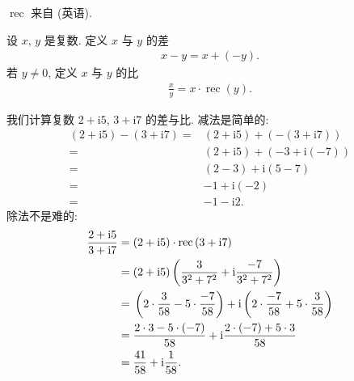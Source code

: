\documentclass[../libro.tex]{subfiles}
\begin{document}
\(\operatorname{rec}\) 来自  (英语).

\begin{definition}
    设 \(x\), \(y\) 是复数.
    定义 \(x\) 与 \(y\) 的差
    \begin{align*}
        x - y = x + (-y).
    \end{align*}
    若 \(y \neq 0\), 定义 \(x\) 与 \(y\) 的比
    \begin{align*}
        \frac{x}{y} = x \cdot \operatorname{rec} {(y)}.
    \end{align*}
\end{definition}

\begin{example}
    我们计算复数
    \(2 + \mathrm{i} 5\), \(3 + \mathrm{i} 7\)
    的差与比.
    减法是简单的:
    \begin{align*}
        (2 + \mathrm{i} 5) - (3 + \mathrm{i} 7)
        = {} &
        (2 + \mathrm{i} 5) + (-(3 + \mathrm{i} 7))
        \\
        = {} &
        (2 + \mathrm{i} 5) + (-3 + \mathrm{i} (-7))
        \\
        = {} &
        (2 - 3) + \mathrm{i} (5 - 7)
        \\
        = {} &
        {-1} + \mathrm{i} (-2)
        \\
        = {} &
        {-1} - \mathrm{i} 2.
    \end{align*}
    除法不是难的:
    \begin{align*}
        \frac{2 + \mathrm{i} 5}{3 + \mathrm{i} 7}
        = {} &
        (2 + \mathrm{i} 5)
        \cdot
        \operatorname{rec} {(3 + \mathrm{i} 7)}
        \\
        = {} &
        (2 + \mathrm{i} 5)
        \left(\frac{3}{3^2 + 7^2}
        + \mathrm{i} \frac{-7}{3^2 + 7^2}\right)
        \\
        = {} &
        \left(
            2 \cdot \frac{3}{58} - 5 \cdot \frac{-7}{58}
        \right)
        + \mathrm{i}
        \left(
            2 \cdot \frac{-7}{58} + 5 \cdot \frac{3}{58}
        \right)
        \\
        = {} &
        \frac{2 \cdot 3 - 5 \cdot (-7)}{58}
        + \mathrm{i}
        \frac{2 \cdot (-7) + 5 \cdot 3}{58}
        \\
        = {} &
        \frac{41}{58} + \mathrm{i} \frac{1}{58}.
        \qedhere
    \end{align*}
\end{example}
\end{document}
